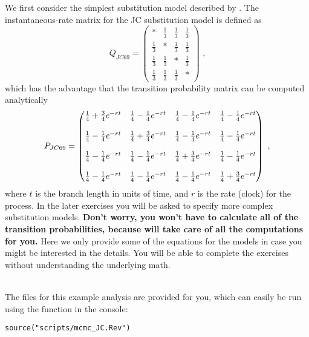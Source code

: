 We first consider the simplest substitution model described by \cite{Jukes1969}.
The instantaneous-rate matrix for the JC substitution model is defined as
\begin{equation*}
Q_{JC69} = \begin{pmatrix} 
{*} & \frac{1}{3} & \frac{1}{3} & \frac{1}{3} \\ 
\frac{1}{3} & {*} & \frac{1}{3} & \frac{1}{3} \\ 
\frac{1}{3} & \frac{1}{3} & {*} & \frac{1}{3} \\ 
\frac{1}{3} & \frac{1}{3} & \frac{1}{3} & {*}  
\end{pmatrix} \mbox{  ,}
\end{equation*}
which has the advantage that the transition probability matrix can be computed analytically
\begin{equation*}
P_{JC69} = \begin{pmatrix} {{1\over4} + {3\over4}e^{-rt}} & {{1\over4} - {1\over4}e^{-rt}} & {{1\over4} - {1\over4}e^{-rt}} & {{1\over4} - {1\over4}e^{-rt}} \\\\ {{1\over4} - {1\over4}e^{-rt}} & {{1\over4} + {3\over4}e^{-rt}} & {{1\over4} - {1\over4}e^{-rt}} & {{1\over4} - {1\over4}e^{-rt}} \\\\ {{1\over4} - {1\over4}e^{-rt}} & {{1\over4} - {1\over4}e^{-rt}} & {{1\over4} + {3\over4}e^{-rt}} & {{1\over4} - {1\over4}e^{-rt}} \\\\ {{1\over4} - {1\over4}e^{-rt}} & {{1\over4} - {1\over4}e^{-rt}} & {{1\over4} - {1\over4}e^{-rt}} & {{1\over4} + {3\over4}e^{-rt}}  
\end{pmatrix} \mbox{  ,}
\end{equation*}
where $t$ is the branch length in units of time, and $r$ is the rate (clock) for the process.
In the later exercises you will be asked to specify more complex substitution models.
\textbf{Don't worry, you won't have to calculate all of the transition probabilities, because
\RevBayes will take care of all the computations for you.} 
Here we only provide some of the equations for the models in case you might be interested in the details.
You will be able to complete the exercises without understanding the underlying math.


\noindent \\ \impmark The files for this example analysis are provided for you, which can easily be run using the  function in the \RevBayes console:
{\tt \begin{snugshade*}
\begin{lstlisting}
source("scripts/mcmc_JC.Rev")
\end{lstlisting}
\end{snugshade*}}

